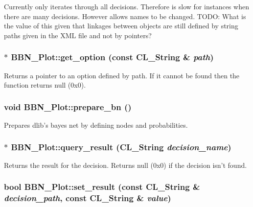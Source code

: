 Currently only iterates through all decisions. Therefore is slow for instances when there are many decisions. However allows names to be changed. TODO: What is the value of this given that linkages between objects are still defined by string paths given in the XML file and not by pointers? \hypertarget{classBBN__Plot_a9c9ac208b1d4558604e6ea46e90ceb6a}{
\subsubsection[{get\_\-option}]{ $\ast$ BBN\_\-Plot::get\_\-option (const CL\_\-String \& {\em path})}}
\label{classBBN__Plot_a9c9ac208b1d4558604e6ea46e90ceb6a}
Returns a pointer to an option defined by path. If it cannot be found then the function returns null (0x0). \hypertarget{classBBN__Plot_acc89676366edd3b07bfb9ec6d4bb61b5}{
\subsubsection[{prepare\_\-bn}]{\setlength{\rightskip}{0pt plus 5cm}void BBN\_\-Plot::prepare\_\-bn ()}}
\label{classBBN__Plot_acc89676366edd3b07bfb9ec6d4bb61b5}
Prepares dlib's bayes net by defining nodes and probabilities. \hypertarget{classBBN__Plot_a85baec5f5adfc1e3b1e869c68a909538}{
\subsubsection[{query\_\-result}]{ $\ast$ BBN\_\-Plot::query\_\-result (CL\_\-String {\em decision\_\-name})}}
\label{classBBN__Plot_a85baec5f5adfc1e3b1e869c68a909538}
Returns the result for the decision. Returns null (0x0) if the decision isn't found. \hypertarget{classBBN__Plot_ab3f21c1b59ad41eb450f16170e13934c}{
\subsubsection[{set\_\-result}]{\setlength{\rightskip}{0pt plus 5cm}bool BBN\_\-Plot::set\_\-result (const CL\_\-String \& {\em decision\_\-path}, \/  const CL\_\-String \& {\em value})}}
